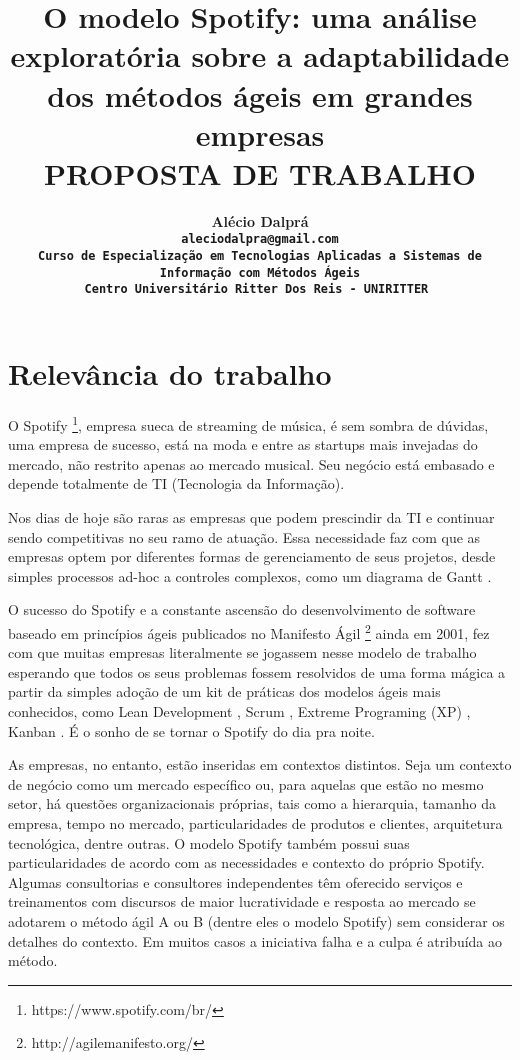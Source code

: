 \documentclass[11pt,a4paper]{article}
\begin{document}
\title{O modelo Spotify: uma análise exploratória sobre a adaptabilidade dos métodos ágeis em grandes empresas\\ \smallskip
\small{ PROPOSTA DE TRABALHO}}

\author{ \bf Alécio Dalprá\\
		\tt aleciodalpra@gmail.com \\
		Curso de Especialização em Tecnologias Aplicadas a Sistemas de Informação com Métodos Ágeis \\
		Centro Universitário Ritter Dos Reis - UNIRITTER 
}

\maketitle
\thispagestyle{empty}




\section{Relevância do trabalho} \label{sec:intro}

O Spotify \footnote{{https://www.spotify.com/br/}}, empresa sueca de streaming de música, é sem sombra de dúvidas, uma empresa de sucesso, está na moda e entre as startups mais invejadas do mercado, não restrito apenas ao mercado musical. Seu negócio está embasado e depende totalmente de TI (Tecnologia da Informação).

Nos dias de hoje são raras as empresas que podem prescindir da TI e continuar sendo competitivas no seu ramo de atuação. Essa necessidade faz com que as empresas optem por diferentes formas de gerenciamento de seus projetos, desde simples processos ad-hoc a controles complexos, como um diagrama de Gantt \cite{Lourenco:Dissertacao}.

O sucesso do Spotify e a constante ascensão do desenvolvimento de software baseado em princípios ágeis publicados no Manifesto Ágil \footnote{http://agilemanifesto.org/} ainda em 2001, fez com que muitas empresas literalmente se jogassem nesse modelo de trabalho esperando que todos os seus problemas fossem resolvidos de uma forma mágica a partir da simples adoção de um kit de práticas dos modelos ágeis mais conhecidos, como Lean Development \cite{MaryTomPoppendieck}, Scrum \cite{Schwaber}, Extreme Programing (XP) \cite{BeckFowler}, Kanban \cite{Rasmusson}. É o sonho de se tornar o Spotify do dia pra noite.

As empresas, no entanto, estão inseridas em contextos distintos. Seja um contexto de negócio como um mercado específico ou, para aquelas que estão no mesmo setor, há questões organizacionais próprias, tais como a hierarquia, tamanho da empresa, tempo no mercado, particularidades de produtos e clientes, arquitetura tecnológica, dentre outras. O modelo Spotify também possui suas particularidades de acordo com as necessidades e contexto do próprio Spotify. Algumas consultorias e consultores independentes têm oferecido serviços e treinamentos com discursos de maior lucratividade e resposta ao mercado se adotarem o método ágil A ou B (dentre eles o modelo Spotify) sem considerar os detalhes do contexto. Em muitos casos a iniciativa falha e a culpa é atribuída ao método.
\end{document}
